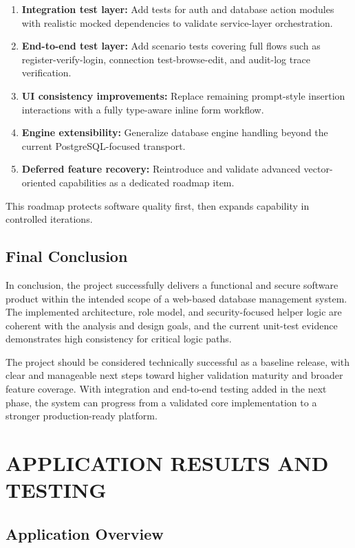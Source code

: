 \begin{enumerate}
    \item \textbf{Integration test layer:} Add tests for auth and database action modules with realistic mocked dependencies to validate service-layer orchestration.
    \item \textbf{End-to-end test layer:} Add scenario tests covering full flows such as register-verify-login, connection test-browse-edit, and audit-log trace verification.
    \item \textbf{UI consistency improvements:} Replace remaining prompt-style insertion interactions with a fully type-aware inline form workflow.
    \item \textbf{Engine extensibility:} Generalize database engine handling beyond the current PostgreSQL-focused transport.
    \item \textbf{Deferred feature recovery:} Reintroduce and validate advanced vector-oriented capabilities as a dedicated roadmap item.
\end{enumerate}

This roadmap protects software quality first, then expands capability in controlled iterations.


\section{Final Conclusion}

In conclusion, the project successfully delivers a functional and secure software product within the intended scope of a web-based database management system. The implemented architecture, role model, and security-focused helper logic are coherent with the analysis and design goals, and the current unit-test evidence demonstrates high consistency for critical logic paths.

The project should be considered technically successful as a baseline release, with clear and manageable next steps toward higher validation maturity and broader feature coverage. With integration and end-to-end testing added in the next phase, the system can progress from a validated core implementation to a stronger production-ready platform.


\chapter{APPLICATION RESULTS AND TESTING}

\section{Application Overview}

